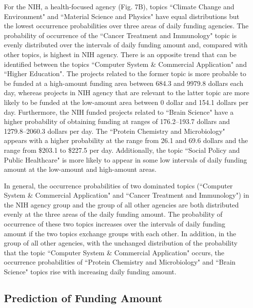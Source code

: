 For the NIH, a health-focused agency (Fig. 7B), topics ``Climate Change and Environment" and ``Material Science and Physics" have equal distributions but the lowest occurrence probabilities over three areas of daily funding agencies. The probability of occurrence of the ``Cancer Treatment and Immunology" topic is evenly distributed over the intervals of daily funding amount and, compared with other topics, is highest in NIH agency. There is an opposite trend that can be identified between the topics ``Computer System \& Commercial Application" and ``Higher Education". The projects related to the former topic is more probable to be funded at a high-amount funding area between 684.3 and 9979.8 dollars each day, whereas projects in NIH agency that are relevant to the latter topic are more likely to be funded at the low-amount area between 0 dollar and 154.1 dollars per day. Furthermore, the NIH funded projects related to ``Brain Science" have a higher probability of obtaining funding at ranges of 176.2--193.7 dollars and 1279.8--2060.3 dollars per day. The ``Protein Chemistry and Microbiology" appears with a higher probability at the range from 26.1 and 69.6 dollars and the range from \$203.1 to \$227.5 per day. Additionally, the topic ``Social Policy and Public Healthcare" is more likely to appear in some low intervals of daily funding amount at the low-amount and high-amount areas.

In general, the occurrence probabilities of two dominated topics (``Computer System \& Commercial Application" and ``Cancer Treatment and Immunology") in the NIH agency group and the group of all other agencies are both distributed evenly at the three areas of the daily funding amount. The probability of occurrence of these two topics increases over the intervals of daily funding amount if the two topics exchange groups with each other. In addition, in the group of all other agencies, with the unchanged distribution of the probability that the topic ``Computer System \& Commercial Application" occurs, the occurrence probabilities of ``Protein Chemistry and Microbiology" and ``Brain Science" topics rise with increasing daily funding amount.

\subsection{Prediction of Funding Amount}

